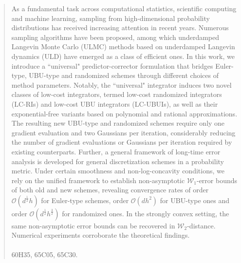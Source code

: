 \documentclass[12pt]{article}
\numberwithin{equation}{section}
\begin{document}
\begin{abstract}
%
As a fundamental task across  computational statistics, scientific computing and machine learning, sampling from high-dimensional probability distributions has received increasing attention in recent years.  Numerous sampling algorithms have been proposed, among which underdamped Langevin Monte Carlo (ULMC) methods based on underdamped Langevin dynamics (ULD) have emerged as a class of efficient ones.
In this work, we introduce a ``universal" predictor-corrector formulation that bridges Euler-type, UBU-type and randomized schemes through different choices of method parameters.
Notably, the ``universal" integrator induces two novel classes of low-cost integrators, termed low-cost randomized integrators (LC-RIs) and low-cost UBU integrators (LC-UBUIs), as well as their exponential-free variants based on polynomial and rational approximations. The resulting new UBU-type and randomized schemes require only one gradient evaluation and two Gaussians per iteration, considerably reducing the number of gradient evaluations or Gaussians per iteration required by existing counterparts.
Further, a general framework of long-time error analysis is developed for general discretization schemes in a probability metric. Under 
certain smoothness and non-log-concavity conditions, 
we rely on the unified framework to establish non-asymptotic $\mathcal{W}_1$-error bounds of both old and new schemes, revealing convergence rates of order $\mathcal{O}(d^{\frac{1}{2}}h)$ for Euler-type schemes, order $\mathcal{O}(d h^2)$ for UBU-type ones and order $\mathcal{O}(d^{\frac{1}{2}}h^{\frac{3}{2}})$ for randomized ones. 
In the strongly convex setting, the same non-asymptotic error bounds can be recovered in $\mathcal{W}_2$-distance. Numerical experiments corroborate the theoretical findings.  
\\
\\
 60H35, 65C05, 65C30.\\

\end{abstract}
\end{document}

